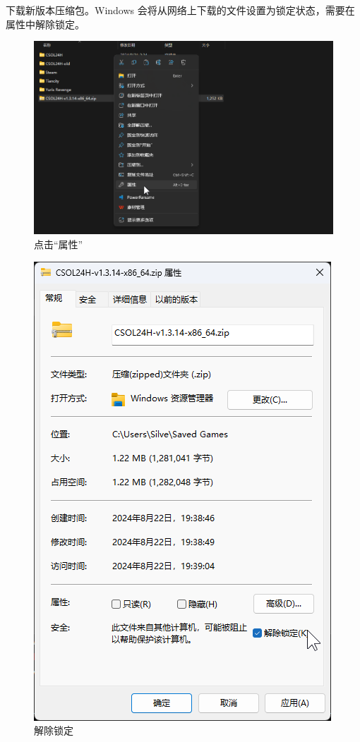 下载新版本压缩包。Windows 会将从网络上下载的文件设置为锁定状态，需要在属性中解除锁定。

\begin{figure}[H]
    \Centering
    \includegraphics[width=\textwidth]{docs/assets/update/unlock_00.png}
    \caption{点击“属性”}
\end{figure}

\begin{figure}[H]
    \Centering
    \includegraphics[width=\textwidth]{docs/assets/update/unlock_01.png}
    \caption{解除锁定}
\end{figure}

